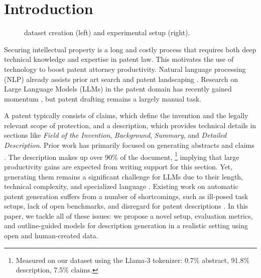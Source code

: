 \section{Introduction}

\begin{figure}[!t]
  \centering
  \caption{
    \DatasetName dataset creation (left) and experimental setup (right). 
  }
  \label{fig:dataset_creation}
\end{figure}

Securing intellectual property is a long and costly process that requires both deep technical knowledge and expertise in patent law.
This motivates the use of technology to boost patent attorney productivity.
Natural language processing (NLP) already assists prior art search \cite{shalabyPatentRetrievalLiterature2019,stamatisEndEndNeural2022,pujariMultitaskApproachNeural2021} and patent landscaping \citep{CHOI2022121413,pujariThreeRealWorldDatasets2022}.
Research on Large Language Models (LLMs) in the patent domain has recently gained momentum \cite{shomeeComprehensiveSurveyAIbased2024,jiangArtificialIntelligenceExploring2024,casolaSummarizationSimplificationGeneration2022,wangIPEvalBilingualIntellectual2024}, but patent drafting remains a largely manual task.

A patent typically consists of claims, which define the invention and
the legally relevant scope of protection, and a description, which provides technical details in sections like \textit{Field of the Invention}, \textit{Background}, \textit{Summary}, and \textit{Detailed Description}.
Prior work has primarily focused on generating abstracts and claims \cite{Hamborg2017Autom-41994,leePatentTransformer2ControllingPatent2020,christofidellisPGTPromptBased2022,leeEvaluatingGenerativePatent2023,zuoPatentEvalUnderstandingErrors2024,leeInstructPatentGPTTrainingPatent2024,baiPatentGPTLargeLanguage2024}.
The description makes up over 90\% of the document,
\footnote{Measured on our dataset using the Llama-3 tokenizer: 0.7\% abstract, 91.8\% description, 7.5\% claims.}
implying that large productivity gains are expected from writing support for this section.
Yet, generating them remains a significant challenge for LLMs due to their length, technical complexity, and specialized language
\cite{wangPatentformerNovelMethod2024,wangAutoPatentMultiAgentFramework2024}.
Existing work on automatic patent generation suffers from a number of shortcomings, such as ill-posed task setups, lack of open benchmarks, and disregard for patent descriptions \citep{jiangArtificialIntelligenceExploring2024}.
In this paper, we tackle all of these issues: we propose a novel setup, evaluation metrics, and outline-guided models for description generation %
in a realistic setting using open and human-created data.

